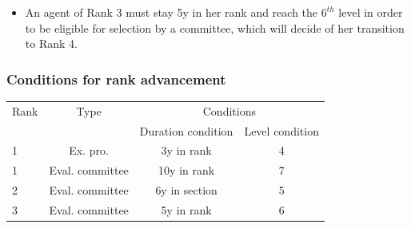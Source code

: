 \documentclass[xcolor=table,ignorenonframetext,12pt]{beamer}
\begin{document}
\begin{frame}
\begin{itemize}
	\item An agent of Rank 3 must stay 5y in her rank and reach the $6^{th}$ level in order to be eligible for selection by a committee, which will decide of her transition to Rank 4.\\
\end{itemize}
\frametitle{Conditions for rank advancement}
\begin{table}
	\small
	\begin{tabular}{l|c|cc}
		
		\toprule
		Rank  & Type &  \multicolumn{2}{c}{Conditions}  \\
		&  			&  Duration condition	&  Level condition \\
		\midrule
		1  &	Ex. pro. 	&   3y in rank  & 	4  \\
		1  &	Eval. committee 	& 	10y in rank &	7   \\ \midrule
		2  &   Eval. committee		& 	6y in section  &	5   \\ \midrule
		3  &   Eval. committee		& 	5y in rank  &	6   \\	
		\bottomrule
	\end{tabular}
\end{table}
\end{frame}



\end{document}
